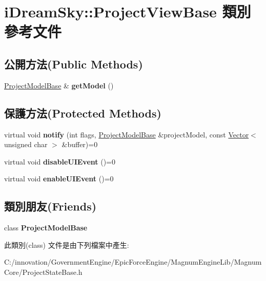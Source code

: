 \hypertarget{classi_dream_sky_1_1_project_view_base}{}\section{i\+Dream\+Sky\+:\+:Project\+View\+Base 類別 參考文件}
\label{classi_dream_sky_1_1_project_view_base}
\subsection*{公開方法(Public Methods)}
\begin{DoxyCompactItemize}
\item 
\hyperlink{classi_dream_sky_1_1_project_model_base}{Project\+Model\+Base} \& {\bfseries get\+Model} ()\hypertarget{classi_dream_sky_1_1_project_view_base_aae03bff3c86c341d7049b07dd7859e7b}{}\label{classi_dream_sky_1_1_project_view_base_aae03bff3c86c341d7049b07dd7859e7b}

\end{DoxyCompactItemize}
\subsection*{保護方法(Protected Methods)}
\begin{DoxyCompactItemize}
\item 
virtual void {\bfseries notify} (int flags, \hyperlink{classi_dream_sky_1_1_project_model_base}{Project\+Model\+Base} \&project\+Model, const \hyperlink{class_i_dream_sky_1_1_vector}{Vector}$<$ unsigned char $>$ \&buffer)=0\hypertarget{classi_dream_sky_1_1_project_view_base_a2854fa1fc315c5b3f99b4450767c91fb}{}\label{classi_dream_sky_1_1_project_view_base_a2854fa1fc315c5b3f99b4450767c91fb}

\item 
virtual void {\bfseries disable\+U\+I\+Event} ()=0\hypertarget{classi_dream_sky_1_1_project_view_base_a48e6b983d50d1972d649ba7953f3d24d}{}\label{classi_dream_sky_1_1_project_view_base_a48e6b983d50d1972d649ba7953f3d24d}

\item 
virtual void {\bfseries enable\+U\+I\+Event} ()=0\hypertarget{classi_dream_sky_1_1_project_view_base_a93f53b3b5e2c5b0e6b359e96b5faf4db}{}\label{classi_dream_sky_1_1_project_view_base_a93f53b3b5e2c5b0e6b359e96b5faf4db}

\end{DoxyCompactItemize}
\subsection*{類別朋友(Friends)}
\begin{DoxyCompactItemize}
\item 
class {\bfseries Project\+Model\+Base}\hypertarget{classi_dream_sky_1_1_project_view_base_a4adee89a75f9facb060d3c44ba6db2ed}{}\label{classi_dream_sky_1_1_project_view_base_a4adee89a75f9facb060d3c44ba6db2ed}

\end{DoxyCompactItemize}


此類別(class) 文件是由下列檔案中產生\+:\begin{DoxyCompactItemize}
\item 
C\+:/innovation/\+Government\+Engine/\+Epic\+Force\+Engine/\+Magnum\+Engine\+Lib/\+Magnum\+Core/Project\+State\+Base.\+h\end{DoxyCompactItemize}
